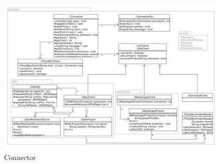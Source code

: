 \documentclass[./00PhotoBox.tex]{subfiles}
\begin{document}
\begin{figure}
    \centering
    \includegraphics[width=1\textwidth]{./img/uml/uml_connector_classdiagramm.pdf}
    \caption{Connector} %
    \label{img:uml_connector} %
\end{figure}

\biblio
\end{document}
